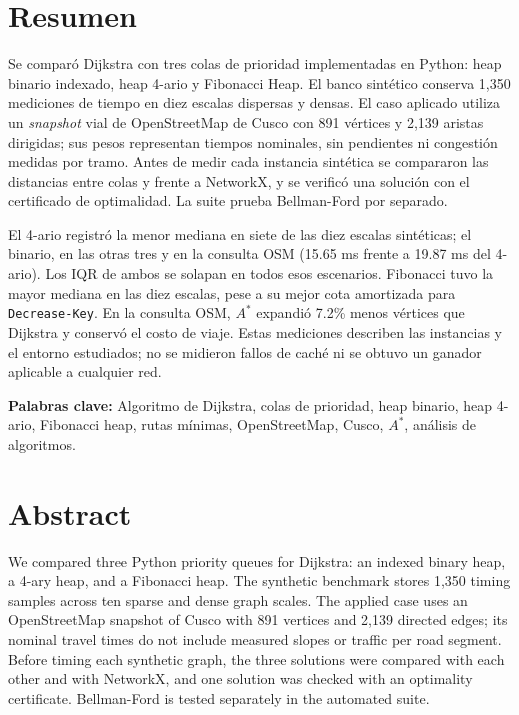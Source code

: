 \section*{Resumen}
\label{sec:resumen}

Se comparó Dijkstra con tres colas de prioridad implementadas en Python: heap binario indexado, heap 4-ario y Fibonacci Heap. El banco sintético conserva 1,350 mediciones de tiempo en diez escalas dispersas y densas. El caso aplicado utiliza un \textit{snapshot} vial de OpenStreetMap de Cusco con 891 vértices y 2,139 aristas dirigidas; sus pesos representan tiempos nominales, sin pendientes ni congestión medidas por tramo. Antes de medir cada instancia sintética se compararon las distancias entre colas y frente a NetworkX, y se verificó una solución con el certificado de optimalidad. La suite prueba Bellman-Ford por separado.

El 4-ario registró la menor mediana en siete de las diez escalas sintéticas; el binario, en las otras tres y en la consulta OSM (15.65 ms frente a 19.87 ms del 4-ario). Los IQR de ambos se solapan en todos esos escenarios. Fibonacci tuvo la mayor mediana en las diez escalas, pese a su mejor cota amortizada para \texttt{Decrease-Key}. En la consulta OSM, $A^*$ expandió 7.2\% menos vértices que Dijkstra y conservó el costo de viaje. Estas mediciones describen las instancias y el entorno estudiados; no se midieron fallos de caché ni se obtuvo un ganador aplicable a cualquier red.

\vspace{0.4cm}
\noindent\textbf{Palabras clave:} Algoritmo de Dijkstra, colas de prioridad, heap binario, heap 4-ario, Fibonacci heap, rutas mínimas, OpenStreetMap, Cusco, $A^*$, análisis de algoritmos.

\newpage

\vspace*{0.5cm}
\section*{Abstract}
\label{sec:abstract}

We compared three Python priority queues for Dijkstra: an indexed binary heap, a 4-ary heap, and a Fibonacci heap. The synthetic benchmark stores 1,350 timing samples across ten sparse and dense graph scales. The applied case uses an OpenStreetMap snapshot of Cusco with 891 vertices and 2,139 directed edges; its nominal travel times do not include measured slopes or traffic per road segment. Before timing each synthetic graph, the three solutions were compared with each other and with NetworkX, and one solution was checked with an optimality certificate. Bellman-Ford is tested separately in the automated suite.

